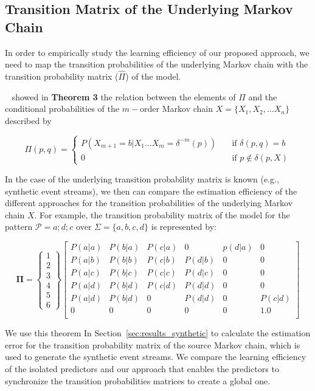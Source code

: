  
\subsection{Transition Matrix of the Underlying Markov Chain}
\label{sec:underlaying_mc}
\par In order to empirically study the learning efficiency of our proposed approach, we need to map the transition probabilities of the underlying Markov chain with the transition probability matrix ($\hat{\Pi}$) of the \pmcmr model. \par ~\citet{nuel_pattern_2008} showed in \textbf{Theorem 3} the relation between the elements  of 
$\Pi$ and the conditional probabilities of the $m-$order Markov chain $X=\{X_1, X_2, \ldots X_n\}$ described by 

\[ \Pi(p, q) =
\begin{cases}
P(X_{m+1}=b|X_1\ldots X_m=\delta^{-m}(p))     & \quad \text{if } \delta(p,q)=b \\
0  & \quad \text{if } p \notin  \delta(p,X)
\end{cases}
\]
\par In the case of the underlying transition probability matrix is known (e.g., synthetic event streams), we then can compare the estimation efficiency of the different approaches for the transition probabilities of the underlying Markov chain $X$.  For example, the transition probability matrix of the \pmcmr model for the pattern $\mathcal{P}=a ; d ; c$ over  $\Sigma=\{a,b,c,d\}$ is represented by: 

\begin{equation}
\label{eq:matrix}
\boldsymbol{\Pi} = 
\begin{Bmatrix} 
 1          \\ 2        \\3             \\4         \\5         \\ 6 
\end{Bmatrix}
\begin{bmatrix} 
P(a|a) 	& P(b|a) 		& P(c|a) 		& 0			  & p(d|a) 	& 0  \\
P(a|b) 	& P(b|b) 		& P(c|b) 		& P(d|b)	  & 0 	    & 0  \\
P(a|c) 	& P(b|c) 		& P(c|c) 		& P(d|c) 	  & 0 	    & 0  \\
P(a|d) 	& P(b|d) 		& P(c|d) 		& P(d|d)	  & 0 	    & 0  \\
P(a|d) 	& P(b|d) 		&  0	 	    & P(d|d)	  & 0 	    & P(c|d)  \\
0			& 0			& 0		        & 0    		  & 0		& 1.0     \\
\end{bmatrix}
\end{equation} 


\par We use this theorem In Section~\ref{sec:results_synthetic} to calculate the estimation error for the transition probability matrix of the source Markov chain, which is used to generate the synthetic event streams. We compare the learning efficiency of the isolated \pmcmr predictors and our approach that enables the \pmcmr predictors to synchronize the transition probabilities matrices to create a global one. 